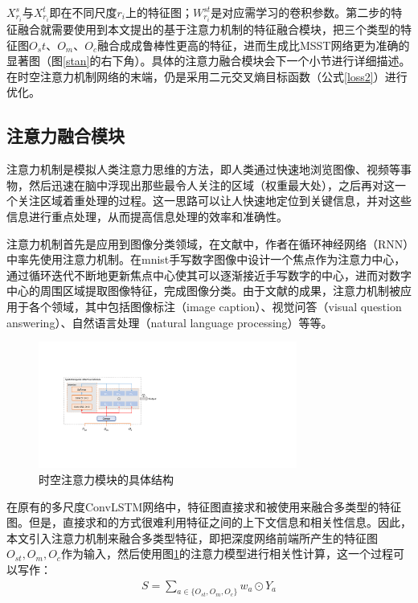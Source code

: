 $X^{s}_{r_i}$与$X^{t}_{r_i}$即在不同尺度$r_i$上的特征图；$W^{st}_{r_i}$是对应需学习的卷积参数。第二步的特征融合就需要使用到本文提出的基于注意力机制的特征融合模块，把三个类型的特征图$O_st$、$O_m$、$O_c$融合成成鲁棒性更高的特征，进而生成比MSST网络更为准确的显著图（图\ref{stan}的右下角）。具体的注意力融合模块会下一个小节进行详细描述。在时空注意力机制网络的末端，仍是采用二元交叉熵目标函数（公式\ref{loss2}）进行优化。

\subsection{注意力融合模块}
注意力机制是模拟人类注意力思维的方法，即人类通过快速地浏览图像、视频等事物，然后迅速在脑中浮现出那些最令人关注的区域（权重最大处），之后再对这一个关注区域着重处理的过程。这一思路可以让人快速地定位到关键信息，并对这些信息进行重点处理，从而提高信息处理的效率和准确性。

注意力机制首先是应用到图像分类领域，在文献\cite{mnih2014recurrent}中，作者在循环神经网络（RNN）中率先使用注意力机制。在mnist手写数字图像中设计一个焦点作为注意力中心，通过循环迭代不断地更新焦点中心使其可以逐渐接近手写数字的中心，进而对数字中心的周围区域提取图像特征，完成图像分类。由于文献\cite{mnih2014recurrent}的成果，注意力机制被应用于各个领域，其中包括图像标注（image caption）\cite{lu2016hierarchical,chen2017sca}、视觉问答（visual question answering）\cite{lu2016hierarchical,yu2017multi}、自然语言处理（natural language processing）\cite{bahdanau2014neural,luong2015effective}等等。

\begin{figure}
 \centering
\includegraphics[width=8.5cm]{figures/attention}
\caption{时空注意力模块的具体结构}
\label{sta}
\end{figure}

在原有的多尺度ConvLSTM网络中，特征图直接求和被使用来融合多类型的特征图。但是，直接求和的方式很难利用特征之间的上下文信息和相关性信息。因此，本文引入注意力机制来融合多类型特征，即把深度网络前端所产生的特征图$O_{st}, O_{m}, O_{c}$作为输入，然后使用图\ref{sta}的注意力模型进行相关性计算，这一个过程可以写作：
\begin{equation}
 \label{eq4_1}
 \begin{aligned}
   S  =  \sum_{a \in \{O_{st}, O_{m}, O_{c}\}} w_{a} \odot Y_{a}
   \end{aligned}
\end{equation}

